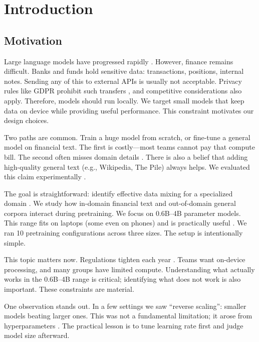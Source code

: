 \chapter{Introduction}

\section{Motivation}

Large language models have progressed rapidly \parencite{vaswani2017attention,radford2019language,brown2020language,touvron2023llama}. However, finance remains difficult. Banks and funds hold sensitive data: transactions, positions, internal notes. Sending any of this to external APIs is usually not acceptable. Privacy rules like GDPR prohibit such transfers \parencite{eu2016gdpr}, and competitive considerations also apply. Therefore, models should run locally. We target small models that keep data on device while providing useful performance. This constraint motivates our design choices.

Two paths are common. Train a huge model from scratch, or fine-tune a general model on financial text. The first is costly—most teams cannot pay that compute bill. The second often misses domain details \parencite{gururangan2020don}. There is also a belief that adding high-quality general text (e.g., Wikipedia, The Pile) always helps. We evaluated this claim experimentally \parencite{gao2020pile,raffel2020exploring,longpre2023pretrainer}.

The goal is straightforward: identify effective data mixing for a specialized domain \parencite{wu2023bloomberggpt}. We study how in-domain financial text and out-of-domain general corpora interact during pretraining. We focus on 0.6B–4B parameter models. This range fits on laptops (some even on phones) and is practically useful \parencite{yang2024qwen2,xia2023sheared,team2024gemma,javaheripi2023phi}. We ran 10 pretraining configurations across three sizes. The setup is intentionally simple.

This topic matters now. Regulations tighten each year \parencite{eu2016gdpr}. Teams want on-device processing, and many groups have limited compute. Understanding what actually works in the 0.6B--4B range is critical; identifying what does not work is also important. These constraints are material.

One observation stands out. In a few settings we saw ``reverse scaling'': smaller models beating larger ones. This was not a fundamental limitation; it arose from hyperparameters \parencite{kaplan2020scaling,hoffmann2022training,mccandlish2018empirical}. The practical lesson is to tune learning rate first and judge model size afterward.

